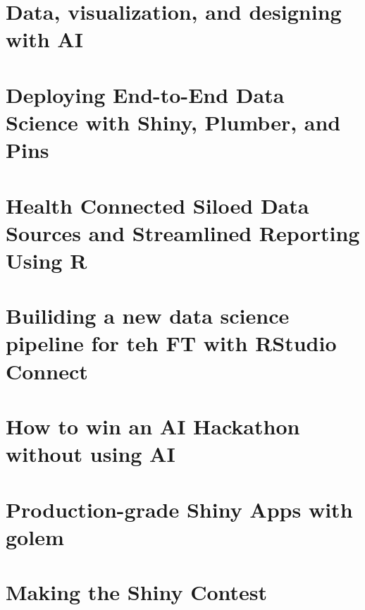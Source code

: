 \documentclass[]{book}
\begin{document}
\hypertarget{data-visualization-and-designing-with-ai}{%
\section{Data, visualization, and designing with AI}\label{data-visualization-and-designing-with-ai}}

\hypertarget{deploying-end-to-end-data-science-with-shiny-plumber-and-pins}{%
\section{Deploying End-to-End Data Science with Shiny, Plumber, and Pins}\label{deploying-end-to-end-data-science-with-shiny-plumber-and-pins}}

\hypertarget{health-connected-siloed-data-sources-and-streamlined-reporting-using-r}{%
\section{Health Connected Siloed Data Sources and Streamlined Reporting Using R}\label{health-connected-siloed-data-sources-and-streamlined-reporting-using-r}}

\hypertarget{builiding-a-new-data-science-pipeline-for-teh-ft-with-rstudio-connect}{%
\section{Builiding a new data science pipeline for teh FT with RStudio Connect}\label{builiding-a-new-data-science-pipeline-for-teh-ft-with-rstudio-connect}}

\hypertarget{how-to-win-an-ai-hackathon-without-using-ai}{%
\section{How to win an AI Hackathon without using AI}\label{how-to-win-an-ai-hackathon-without-using-ai}}

\hypertarget{production-grade-shiny-apps-with-golem}{%
\section{Production-grade Shiny Apps with golem}\label{production-grade-shiny-apps-with-golem}}

\hypertarget{making-the-shiny-contest}{%
\section{Making the Shiny Contest}\label{making-the-shiny-contest}}
\end{document}
